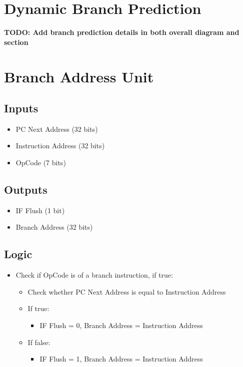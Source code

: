 \documentclass[12pt]{report}
\begin{document}
\section{Dynamic Branch Prediction}
\textbf{TODO: Add branch prediction details in both overall diagram and section}

\section{Branch Address Unit}

\subsection{Inputs}
\begin{itemize}
    \item PC Next Address (32 bits)
    \item Instruction Address (32 bits)
    \item OpCode (7 bits)
\end{itemize}

\subsection{Outputs}
\begin{itemize}
    \item IF Flush (1 bit)
    \item Branch Address (32 bits)
\end{itemize}

\subsection{Logic}
\begin{itemize}
    \item Check if OpCode is of a branch instruction, if true:
    \begin{itemize}
        \item Check whether PC Next Address is equal to Instruction Address
        \item If true:
        \begin{itemize}
            \item IF Flush = 0, Branch Address = Instruction Address
        \end{itemize}
        \item If false:
        \begin{itemize}
            \item IF Flush = 1, Branch Address = Instruction Address
        \end{itemize}
    \end{itemize}
\end{itemize}
\end{document}
